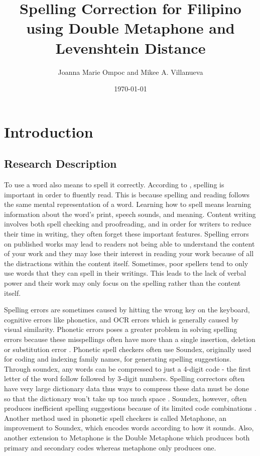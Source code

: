 \documentclass[12pt]{book}
\begin{document}
\title{Spelling Correction for Filipino using Double Metaphone and Levenshtein Distance}
\author{Joanna Marie Ompoc and Mikee A. Villanueva}
\date{\today}
\maketitle
\let\cleardoublepage\clearpage
\pagebreak
\tableofcontents
\let\cleardoublepage\clearpage
\listoffigures
\let\cleardoublepage\clearpage
\listoftables
\let\cleardoublepage\clearpage
\chapter{Introduction}
\doublespacing
\section{Research Description}\label{intro}
To use a word also means to spell it correctly. According to \cite{gredler2002snow}, spelling is important in order to fluently read. This is because spelling and reading follows the same mental representation of a word. Learning how to spell means learning information about the word’s print, speech sounds, and meaning\cite{moats2005spelling}. Content writing involves both spell checking and proofreading, and in order for writers to reduce their time in writing, they often forget these important features. Spelling errors on published works may lead to readers not being able to understand the content of your work and they may lose their interest in reading your work because of all the distractions within the content itself. Sometimes, poor spellers tend to only use words that they can spell in their writings. This leads to the lack of verbal power and their work may only focus on the spelling rather than the content itself\cite{moats2005spelling}.

Spelling errors are sometimes caused by hitting the wrong key on the keyboard, cognitive errors like phonetics, and OCR errors which is generally caused by visual similarity. Phonetic errors poses a greater problem in solving spelling errors because these misspellings often have more than a single insertion, deletion or substitution error \cite{kukich1992techniques}. Phonetic spell checkers often use Soundex, originally used for coding and indexing family names, for generating spelling suggestions. Through soundex, any words can be compressed to just a 4-digit code - the first letter of the word follow followed by 3-digit numbers. Spelling correctors often have very large dictionary data thus ways to compress these data must be done so that the dictionary won’t take up too much space \cite{zobel1995finding}. Soundex, however, often produces inefficient spelling suggestions because of its limited code combinations \cite{zobel1996phonetic}. Another method used in phonetic spell checkers is called Metaphone, an improvement to Soundex, which encodes words according to how it sounds. Also, another extension to Metaphone is the Double Metaphone which produces both primary and secondary codes whereas metaphone only produces one\cite{philips2000double}.
\end{document}
